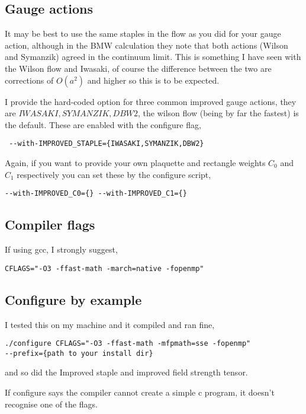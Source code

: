 \documentclass[12pt]{article}
\begin{document}
\subsection{Gauge actions}

It may be best to use the same staples in the flow as you did for your gauge action, although in the BMW calculation they
note that both actions (Wilson and Symanzik) agreed in the continuum limit. This is something I have seen with the
Wilson flow and Iwasaki, of course the difference between the two are corrections of $O(a^2)$ and higher so this is to be expected.

I provide the hard-coded option for three common improved gauge actions, they are $IWASAKI,SYMANZIK,DBW2$, the wilson flow (being by
far the fastest) is the default. These are enabled with the configure flag,
\begin{verbatim}
 --with-IMPROVED_STAPLE={IWASAKI,SYMANZIK,DBW2}
\end{verbatim}

Again, if you want to provide your own plaquette and rectangle weights $C_0$ and $C_1$ respectively you can set these by the configure script,
\begin{verbatim}
--with-IMPROVED_C0={} --with-IMPROVED_C1={}
\end{verbatim}

\subsection{Compiler flags}

If using gcc, I strongly suggest,
\begin{verbatim}
CFLAGS="-O3 -ffast-math -march=native -fopenmp"
\end{verbatim}

\subsection{Configure by example}

I tested this on my machine and it compiled and ran fine,
\begin{verbatim}
./configure CFLAGS="-O3 -ffast-math -mfpmath=sse -fopenmp" 
--prefix={path to your install dir}
\end{verbatim}

and so did the Improved staple and improved field strength tensor.

If configure says the compiler cannot create a simple c program, it doesn't recognise one of the flags.
\end{document}
